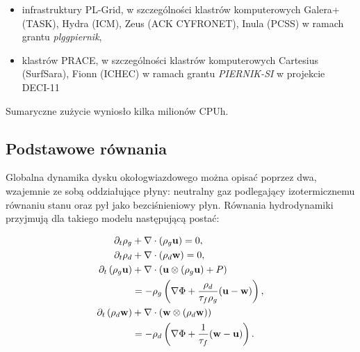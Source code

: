 \begin{itemize}
   \item infrastruktury PL-Grid, w szczególności klastrów
      komputerowych Galera+ (TASK), Hydra (ICM), Zeus (ACK CYFRONET), Inula
      (PCSS) w ramach grantu \emph{plggpiernik},
   \item klastrów PRACE, w szczególności klastrów komputerowych
      Cartesius (SurfSara), Fionn (ICHEC) w ramach grantu \emph{PIERNIK-SI} w
      projekcie DECI-11
\end{itemize}
Sumaryczne zużycie wyniosło kilka milionów CPUh.




\subsection{Podstawowe równania}
Globalna dynamika dysku okołogwiazdowego można opisać poprzez dwa, wzajemnie ze
sobą oddziałujące płyny: neutralny gaz podlegający izotermicznemu równaniu
stanu oraz pył jako bezciśnieniowy płyn. Równania hydrodynamiki przyjmują dla
takiego modelu następującą postać:

\begin{align}
   \partial_t \rho_g &+ \nabla\cdot\left(\rho_g\mathbf{u}\right) = 0,\label{eq1}\\
   \partial_t \rho_d &+ \nabla\cdot\left(\rho_d\mathbf{w}\right) = 0,\label{eq2}\\
\partial_t \left(\rho_g\mathbf{u}\right) &+
   \nabla\cdot(\mathbf{u}\otimes(\rho_g\mathbf{u})+P) \notag\\
 &= -\rho_g\left(\nabla\Phi +
\frac{\rho_d}{\tau_f\rho_g}(\mathbf{u}-\mathbf{w})\right),\label{eq3}\\
\partial_t \left(\rho_d\mathbf{w}\right) &+
\nabla\cdot(\mathbf{w}\otimes(\rho_d\mathbf{w})) \notag\\
 &= -\rho_d\left(\nabla\Phi + \frac{1}{\tau_f}(\mathbf{w}-\mathbf{u})\right)
\label{eq4}.
\end{align}

